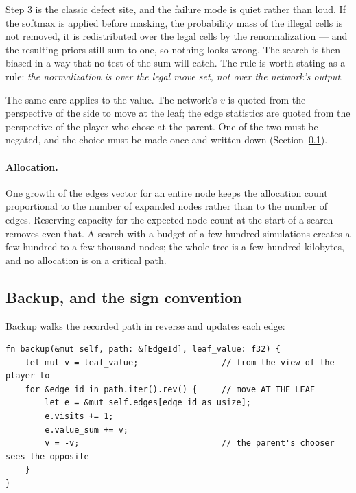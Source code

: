 Step 3 is the classic defect site, and the failure mode is quiet rather than
loud. If the softmax is applied before masking, the probability mass of the
illegal cells is not removed, it is redistributed over the legal cells by the
renormalization --- and the resulting priors still sum to one, so nothing looks
wrong. The search is then biased in a way that no test of the sum will catch. The
rule is worth stating as a rule: \emph{the normalization is over the legal move
set, not over the network's output}.

The same care applies to the value. The network's $v$ is quoted from the
perspective of the side to move at the leaf; the edge statistics are quoted from
the perspective of the player who chose at the parent. One of the two must be
negated, and the choice must be made once and written down (Section~\ref{sec:backup}).

\paragraph{Allocation.} One growth of the edges vector for an entire node keeps
the allocation count proportional to the number of expanded nodes rather than to
the number of edges. Reserving capacity for the expected node count at the start
of a search removes even that. A search with a budget of a few hundred
simulations creates a few hundred to a few thousand nodes; the whole tree is a
few hundred kilobytes, and no allocation is on a critical path.

\subsection{Backup, and the sign convention}
\label{sec:backup}

Backup walks the recorded path in reverse and updates each edge:

\begin{lstlisting}[style=rust,caption={Backup. The value alternates sign at every
ply, because the players alternate.},label={lst:backup}]
fn backup(&mut self, path: &[EdgeId], leaf_value: f32) {
    let mut v = leaf_value;                 // from the view of the player to
    for &edge_id in path.iter().rev() {     // move AT THE LEAF
        let e = &mut self.edges[edge_id as usize];
        e.visits += 1;
        e.value_sum += v;
        v = -v;                             // the parent's chooser sees the opposite
    }
}
\end{lstlisting}


